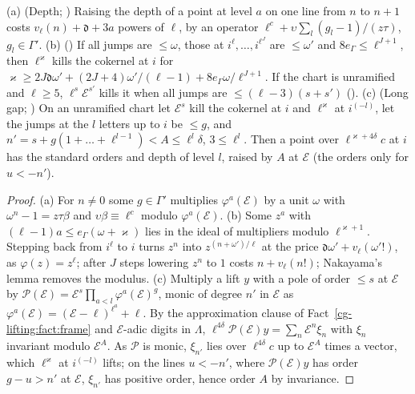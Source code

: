 \begin{lemma}\label{cg-lifting:lem:costs}
(a) (Depth; ) Raising the
depth of a point at level $a$ on one line from $n$ to $n+1$ costs $v_\ell(n)+\mathfrak d+3a$ powers of $\ell$,
by an operator $\ell^{c}+\upsilon\sum_l(g_l-1)/(z\tau)$, $g_l\in\Gamma'$.
(b) () If all jumps are
$\le\omega$, those at $i^\ell,\dots,i^{\ell^J}$ are $\le\omega'$ and $8e_\Gamma\le\ell^{J+1}$, then $\ell^\varkappa$
kills the cokernel at $i$ for $\varkappa\ge2J\mathfrak d\omega'+(2J+4)\omega'/(\ell-1)+8e_\Gamma\omega/\ell^{J+1}$. If the
chart is unramified and $\ell\ge5$, $\ell^s\mathcal E^{s'}$ kills it when all jumps are $\le(\ell-3)(s+s')$
().
(c) (Long gap; ) On an
unramified chart let $\mathcal E^s$ kill the cokernel at $i$ and $\ell^\varkappa$ at $i^{(-l)}$, let the jumps
at the $l$ letters up to $i$ be $\le g$, and $n'=s+g(1+\dots+\ell^{l-1})<A\le\ell^l\delta$,
$3\le\ell^l$. Then a point over $\ell^{\varkappa+4\delta}c$ at $i$ has the standard orders and depth of
level $l$, raised by $A$ at $\mathcal E$ (the orders only for $u<-n'$).
\end{lemma}

\begin{proof}
(a) For $n\ne0$ some $g\in\Gamma'$ multiplies $\varphi^a(\mathcal E)$ by a unit $\omega$ with
$\omega^n-1=z\tau\beta$ and $\upsilon\beta\equiv\ell^c$ modulo $\varphi^a(\mathcal E)$. (b) Some $z^a$ with $(\ell-1)a\le e_\Gamma(\omega+\varkappa)$
lies in the ideal of multipliers modulo $\ell^{\varkappa+1}$. Stepping back from $i^\ell$ to $i$ turns
$z^n$ into $z^{(n+\omega')/\ell}$ at the price $\mathfrak d\omega'+v_\ell(\omega'!)$, as $\varphi(z)=z^\ell$;
after $J$ steps lowering $z^n$ to $1$ costs $n+v_\ell(n!)$; Nakayama's lemma removes the modulus.
(c) Multiply a lift $y$ with a pole of order $\le s$ at $\mathcal E$ by $\mathcal P(\mathcal E)=\mathcal E^s\prod_{a<l}\varphi^a(\mathcal E)^g$,
monic of degree $n'$ in $\mathcal E$ as $\varphi^a(\mathcal E)=(\mathcal E-\ell)^{\ell^a}+\ell$. By the approximation clause of
Fact~\ref{cg-lifting:fact:frame} and $\mathcal E$-adic digits in $\Lambda$, $\ell^{4\delta}\mathcal P(\mathcal E)y=\sum_n\mathcal E^n\xi_n$
with $\xi_n$ invariant modulo $\mathcal E^A$. As $\mathcal P$ is monic, $\xi_{n'}$ lies over $\ell^{4\delta}c$ up to $\mathcal E^A$
times a vector, which $\ell^\varkappa$ at $i^{(-l)}$ lifts; on the lines $u<-n'$, where $\mathcal P(\mathcal E)y$ has order
$g-u>n'$ at $\mathcal E$, $\xi_{n'}$ has positive order, hence order $A$ by invariance.
\end{proof}

